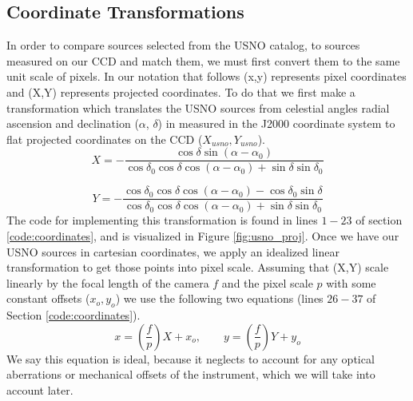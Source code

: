 \documentclass[preprint]{aastex62}
\begin{document}
\subsection{Coordinate Transformations}
In order to compare sources selected from the USNO catalog, to sources measured on our CCD and match them, we must first convert them to the same unit scale of pixels. In our notation that follows (x,y) represents pixel coordinates and (X,Y) represents projected coordinates. To do that we first make a transformation which translates the USNO sources from celestial angles radial ascension and declination ($\alpha$, $\delta$) in measured in the J2000 coordinate system to flat projected coordinates on the CCD ($X_{usno}, Y_{usno}$). 
\begin{equation}
    X = -\frac{\cos\delta \sin(\alpha-\alpha_0)}{\cos\delta_0 \cos\delta \cos(\alpha-\alpha_0) + \sin\delta \sin\delta_0} 
\end{equation}

\begin{equation}
    Y = -\frac{\cos\delta_0 \cos\delta \cos(\alpha-\alpha_0) - \cos\delta_0 \sin\delta}{\cos\delta_0 \cos\delta \cos(\alpha-\alpha_0) + \sin\delta \sin\delta_0}
\end{equation}
The code for implementing this transformation is found in lines $1-23$ of section \ref{code:coordinates}, and is visualized in Figure \ref{fig:usno_proj}.
Once we have our USNO sources in cartesian coordinates, we apply an idealized linear transformation to get those points into pixel scale. Assuming that (X,Y) scale linearly by the focal length of the camera $f$ and the pixel scale $p$ with some constant offsets ($x_o, y_o$) we use the following two equations (lines $26-37$ of Section \ref{code:coordinates}). 
\begin{equation}
    x = \left(\frac{f}{p}\right)X + x_o, \qquad y = \left(\frac{f}{p}\right)Y + y_o 
\end{equation}
We say this equation is ideal, because it neglects to account for any optical aberrations or mechanical offsets of the instrument, which we will take into account later.
\end{document}
